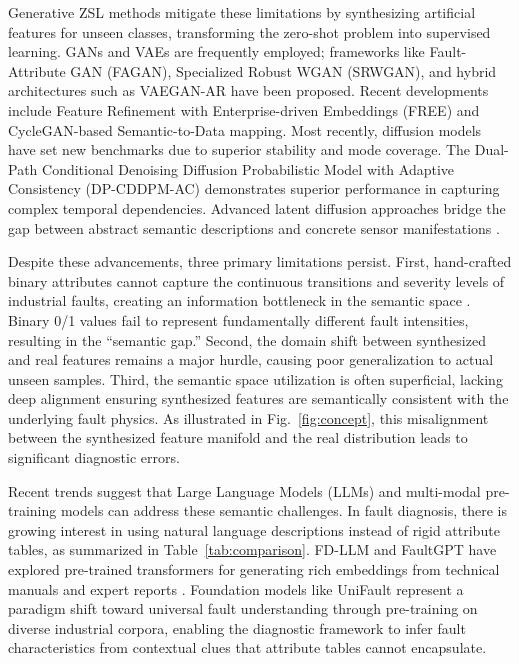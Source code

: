 \documentclass[journal]{IEEEtran}
\begin{document}
Generative ZSL methods mitigate these limitations by synthesizing artificial features for unseen classes, transforming the zero-shot problem into supervised learning. GANs and VAEs are frequently employed; frameworks like Fault-Attribute GAN (FAGAN), Specialized Robust WGAN (SRWGAN), and hybrid architectures such as VAEGAN-AR have been proposed. Recent developments include Feature Refinement with Enterprise-driven Embeddings (FREE) and CycleGAN-based Semantic-to-Data mapping. Most recently, diffusion models have set new benchmarks due to superior stability and mode coverage. The Dual-Path Conditional Denoising Diffusion Probabilistic Model with Adaptive Consistency (DP-CDDPM-AC) demonstrates superior performance in capturing complex temporal dependencies. Advanced latent diffusion approaches bridge the gap between abstract semantic descriptions and concrete sensor manifestations \cite{Mu2025physical, Ma2024broad, Wu2024DDPM, Qin2024diffusion, Chen2024featureGen, Li2024diffusionTIM, GZSLCFD2024, DPCDDPMAC2024}.

Despite these advancements, three primary limitations persist. First, hand-crafted binary attributes cannot capture the continuous transitions and severity levels of industrial faults, creating an information bottleneck in the semantic space \cite{KSS2023, Xu2023semantic, Yang2024HVCB}. Binary 0/1 values fail to represent fundamentally different fault intensities, resulting in the ``semantic gap.'' Second, the domain shift between synthesized and real features remains a major hurdle, causing poor generalization to actual unseen samples. Third, the semantic space utilization is often superficial, lacking deep alignment ensuring synthesized features are semantically consistent with the underlying fault physics. As illustrated in Fig.~\ref{fig:concept}, this misalignment between the synthesized feature manifold and the real distribution leads to significant diagnostic errors.

Recent trends suggest that Large Language Models (LLMs) and multi-modal pre-training models can address these semantic challenges. In fault diagnosis, there is growing interest in using natural language descriptions instead of rigid attribute tables, as summarized in Table~\ref{tab:comparison}. FD-LLM and FaultGPT have explored pre-trained transformers for generating rich embeddings from technical manuals and expert reports \cite{FDLLM2025, FaultGPT2025, IADCLIP2024, UniFault2025}. Foundation models like UniFault represent a paradigm shift toward universal fault understanding through pre-training on diverse industrial corpora, enabling the diagnostic framework to infer fault characteristics from contextual clues that attribute tables cannot encapsulate.
\end{document}
